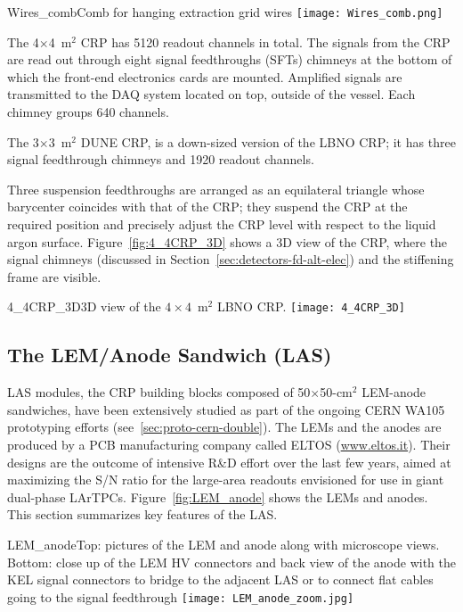 \begin{cdrfigure}{Wires_comb}{Comb for hanging extraction grid wires}
\texttt{[image: Wires\_comb.png]}
\end{cdrfigure}

The 4$\times$4~m$^2$ CRP has 5120 readout channels in total. The
signals from the CRP are read out through eight signal feedthroughs
(SFTs) chimneys
at the bottom of which the front-end electronics cards are mounted. Amplified signals
are transmitted to the DAQ system located on top, outside of the vessel.
Each chimney groups 640 channels. 

The 3$\times$3~m$^2$ DUNE CRP, is a down-sized version of the LBNO
CRP; it has three signal feedthrough chimneys and 1920 readout
channels.

Three suspension
feedthroughs are arranged as an equilateral triangle whose barycenter
coincides with that of the CRP; they suspend the CRP at the required
position and precisely adjust the CRP level with respect to the liquid
argon surface. Figure~\ref{fig:4_4CRP_3D} shows a 3D view of the CRP,
where the signal chimneys  (discussed in 
Section~\ref{sec:detectors-fd-alt-elec}) and the stiffening frame are
visible.
\begin{cdrfigure}{4_4CRP_3D}{3D view of the $4\times4$~m$^2$ LBNO CRP.}
\texttt{[image: 4\_4CRP\_3D]}  
\end{cdrfigure}


\subsection{The LEM/Anode Sandwich (LAS)}

LAS modules, the CRP building blocks composed of 50$\times$50-cm$^2$ LEM-anode 
sandwiches,  have been extensively studied as part of the ongoing CERN
WA105 prototyping efforts (see~\ref{sec:proto-cern-double}). The LEMs
and the anodes are produced by a PCB manufacturing company called
ELTOS (\url{www.eltos.it}). Their designs are the outcome of
intensive R\&D effort over the last few years, aimed at maximizing the
S/N ratio for the large-area readouts envisioned for use in giant
dual-phase LArTPCs.  Figure~\ref{fig:LEM_anode} shows the LEMs and
anodes.  This section summarizes key features of the LAS.


\begin{cdrfigure}
{LEM_anode}{Top: pictures of the LEM and anode along with microscope
  views. Bottom: close up of the LEM HV connectors and back view of the anode 
with the KEL signal connectors to bridge to the adjacent LAS or to connect 
flat cables going to the signal feedthrough}
 \texttt{[image: LEM\_anode\_zoom.jpg]}  
 \end{cdrfigure}


